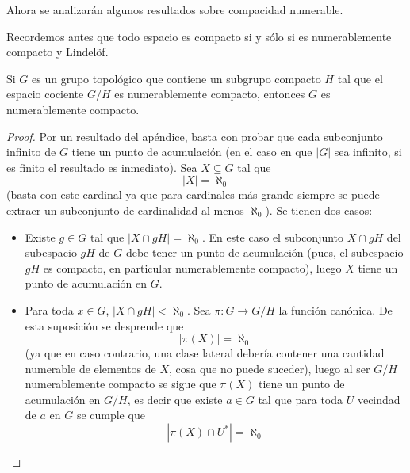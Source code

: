 \documentclass[12pt]{report}
\theoremstyle{largebreak}
\newcommand\abs[1]{\ensuremath{\left|#1\right|}}
\newcommand\cf[3]{\ensuremath{#1:#2\rightarrow#3}}
\begin{document}
    Ahora se analizarán algunos resultados sobre compacidad numerable.

    \begin{obs}
        Recordemos antes que todo espacio es compacto si y sólo si es numerablemente compacto y Lindelöf.
    \end{obs}

    \begin{theor}
        Si $G$ es un grupo topológico que contiene un subgrupo compacto $H$ tal que el espacio cociente $G/H$ es numerablemente compacto, entonces $G$ es numerablemente compacto.
    \end{theor}

    \begin{proof}
        Por un resultado del apéndice, basta con probar que cada subconjunto infinito de $G$ tiene un punto de acumulación (en el caso en que $\abs{G}$ sea infinito, si es finito el resultado es inmediato). Sea $X\subseteq G$ tal que
        \begin{equation*}
            \abs{X}=\aleph_0
        \end{equation*}
        (basta con este cardinal ya que para cardinales más grande siempre se puede extraer un subconjunto de cardinalidad al menos $\aleph_0$). Se tienen dos casos:
        \begin{itemize}
            \item Existe $g\in G$ tal que $\abs{X\cap gH}=\aleph_0$. En este caso el subconjunto $X\cap gH$ del subespacio $gH$ de $G$ debe tener un punto de acumulación (pues, el subespacio $gH$ es compacto, en particular numerablemente compacto), luego $X$ tiene un punto de acumulación en $G$.
            \item Para toda $x\in G$, $\abs{X\cap gH}<\aleph_0$. Sea $\cf{\pi}{G}{G/H}$ la función canónica. De esta suposición se desprende que
            \begin{equation*}
                \abs{\pi(X)}=\aleph_0
            \end{equation*}
            (ya que en caso contrario, una clase lateral debería contener una cantidad numerable de elementos de $X$, cosa que no puede suceder), luego al ser $G/H$ numerablemente compacto se sigue que $\pi(X)$ tiene un punto de acumulación en $G/H$, es decir que existe $a\in G$ tal que para toda $U$ vecindad de $a$ en $G$ se cumple que
            \begin{equation*}
                \abs{\pi(X)\cap U^*}=\aleph_0
            \end{equation*}

\end{itemize}
\end{proof}
\end{document}
